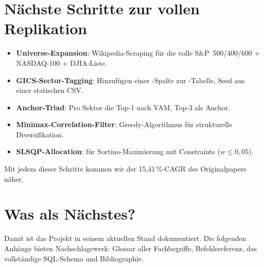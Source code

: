\section{Nächste Schritte zur vollen Replikation}

\begin{itemize}
  \item \textbf{Universe-Expansion}: Wikipedia-Scraping für die volle
        S\&P~500/400/600 + NASDAQ-100 + DJIA-Liste.
  \item \textbf{GICS-Sector-Tagging}: Hinzufügen einer
        -Spalte zur -Tabelle,
        Seed aus einer statischen CSV.
  \item \textbf{Anchor-Triad}: Pro Sektor die Top-1 nach VAM,
        Top-3 als Anchor.
  \item \textbf{Minimax-Correlation-Filter}: Greedy-Algorithmus
        für strukturelle Diversifikation.
  \item \textbf{SLSQP-Allocation}: 
        für Sortino-Maximierung mit Constraints ($w \leq 0{,}05$).
\end{itemize}

Mit jedem dieser Schritte kommen wir der 15{,}41\,\%-CAGR des
Originalpapers näher.

\section{Was als Nächstes?}

Damit ist das Projekt in seinem aktuellen Stand dokumentiert. Die
folgenden Anhänge bieten Nachschlagewerk: Glossar aller
Fachbegriffe, Befehlsreferenz, das vollständige SQL-Schema und
Bibliographie.
